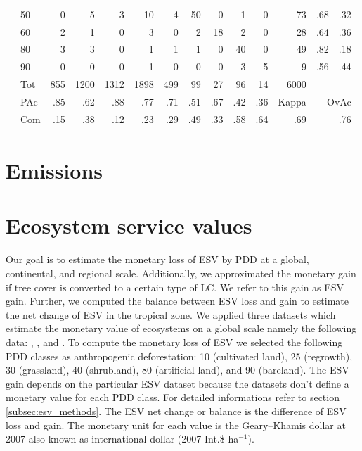 \begin{table}[ht]
\begin{tabular}{llrrrrrrrrrrrr}
					& 50 & 0 & 5 & 3 & 10 & 4 & 50 & 0 & 1 & 0 & 73 & .68 & .32 \\ 
					& 60 & 2 & 1 & 0 & 3 & 0 & 2 & 18 & 2 & 0 & 28 & .64 & .36 \\ 
					& 80 & 3 & 3 & 0 & 1 & 1 & 1 & 0 & 40 & 0 & 49 & .82 & .18 \\ 
					& 90 & 0 & 0 & 0 & 1 & 0 & 0 & 0 & 3 & 5 & 9 & .56 & .44 \\\hline 
					& Tot & 855 & 1200 & 1312 & 1898 & 499 & 99 & 27 & 96 & 14 & 6000 & & \\
					& PAc & .85 & .62 & .88 & .77 & .71 & .51 & .67 & .42 & .36 & Kappa & \multicolumn{2}{r}{OvAc} \\
					& Com & .15 & .38 & .12 & .23 & .29 & .49 & .33 & .58 & .64 & .69 & \multicolumn{2}{r}{.76} \\ \hline
				\end{tabular}
			\end{table}

	\section{Emissions}

	\section{Ecosystem service values}
		Our goal is to estimate the monetary loss of \ac{ESV} by \ac{PDD} at a global, continental, and regional scale. Additionally, we approximated the monetary gain if tree cover is converted to a certain type of \ac{LC}. We refer to this gain as \ac{ESV} gain. Further, we computed the balance between \ac{ESV} loss and gain to estimate the net change of \ac{ESV} in the tropical zone. We applied three datasets which estimate the monetary value of ecosystems on a global scale namely the following data: \citet{Groot2012}, \citet{Costanza2014}, and \citet{Siikamaki2015}. To compute the monetary loss of \ac{ESV} we selected the following \ac{PDD} classes as anthropogenic deforestation: 10 (cultivated land), 25 (regrowth), 30 (grassland), 40 (shrubland), 80 (artificial land), and 90 (bareland). The \ac{ESV} gain depends on the particular \ac{ESV} dataset because the datasets don't define a monetary value for each \ac{PDD} class. For detailed informations refer to section \ref{subsec:esv_methods}. The \ac{ESV} net change or balance is the difference of \ac{ESV} loss and gain. The monetary unit for each value is the Geary–Khamis dollar at 2007 also known as international dollar (2007 Int.\$ ha$^{-1}$).

